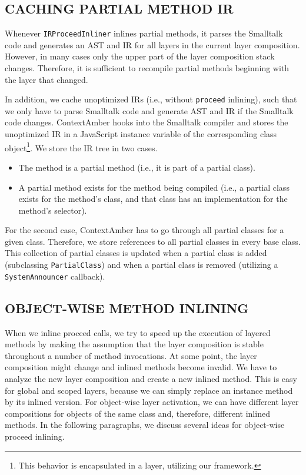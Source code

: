 \documentclass[english,paper=a4,twocolumn=true,DIV=calc,fontsize=9pt]{scrartcl}
\begin{document}
\subsection{CACHING PARTIAL METHOD IR}
Whenever \texttt{IRProceedInliner} inlines partial methods, it parses the Smalltalk code and generates an AST and IR for all layers in the current layer composition. However, in many cases only the upper part of the layer composition stack changes. Therefore, it is sufficient to recompile partial methods beginning with the layer that changed.

In addition, we cache unoptimized IRs (i.e., without \texttt{proceed} inlining), such that we only have to parse Smalltalk code and generate AST and IR if the Smalltalk code changes. ContextAmber hooks into the Smalltalk compiler and stores the unoptimized IR in a JavaScript instance variable of the corresponding class object\footnote{This behavior is encapsulated in a layer, utilizing our framework.}. We store the IR tree in two cases.

\begin{itemize}
    \item The method is a partial method (i.e., it is part of a partial class).
    \item A partial method exists for the method being compiled (i.e., a partial class exists for the method's class, and that class has an implementation for the method's selector).
\end{itemize}

For the second case, ContextAmber has to go through all partial classes for a given class. Therefore, we store references to all partial classes in every base class. This collection of partial classes is updated when a partial class is added (subclassing \texttt{PartialClass}) and when a partial class is removed (utilizing a \texttt{SystemAnnouncer} callback).

\subsection{OBJECT-WISE METHOD INLINING}
When we inline proceed calls, we try to speed up the execution of layered methods by making the assumption that the layer composition is stable throughout a number of method invocations. At some point, the layer composition might change and inlined methods become invalid. We have to analyze the new layer composition and create a new inlined method. This is easy for global and scoped layers, because we can simply replace an instance method by its inlined version. For object-wise layer activation, we can have different layer compositions for objects of the same class and, therefore, different inlined methods. In the following paragraphs, we discuss several ideas for object-wise proceed inlining.
\end{document}
